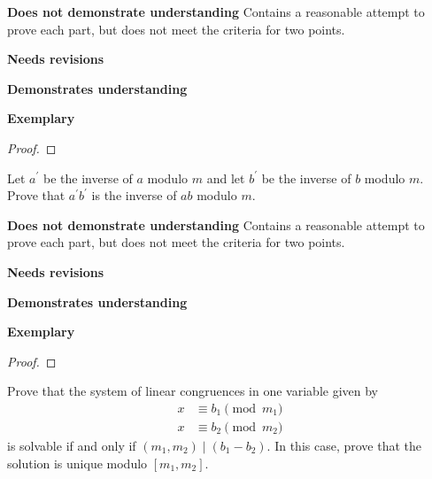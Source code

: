 \documentclass[letterpaper, 11pt]{../ximera}
\begin{document}
\begin{writeRubric}
    \item \textbf{Does not demonstrate understanding}
     Contains a reasonable attempt to prove each part, but does not meet the criteria for two points.
    \item \textbf{Needs revisions}
     
    \item \textbf{Demonstrates understanding}
    
    \item \textbf{Exemplary}
        
\end{writeRubric}
                                       \begin{proof}
 
\end{proof}

\begin{ex}
 Let $a^\prime$ be the inverse of $a$ modulo $m$ and let $b^\prime$ be the inverse of $b$ modulo $m$. Prove that $a^\prime b^\prime$ is the inverse of $ab$ modulo $m.$
\end{ex}

\begin{writeRubric}
    \item \textbf{Does not demonstrate understanding}
     Contains a reasonable attempt to prove each part, but does not meet the criteria for two points.
    \item \textbf{Needs revisions}
     
    \item \textbf{Demonstrates understanding}
    
    \item \textbf{Exemplary}
        
\end{writeRubric}
                                       \begin{proof}
 
\end{proof}

\begin{ex}
Prove that the system of linear congruences in one variable given by 
\begin{align*}
 x&\equiv b_1 \pmod{m_1}\\
 x&\equiv b_2 \pmod{m_2}
\end{align*}
is solvable if and only if $(m_1,m_2)\mid (b_1-b_2).$ In this case, prove that the solution is unique modulo $[m_1,m_2].$
\end{ex}
\end{document}
